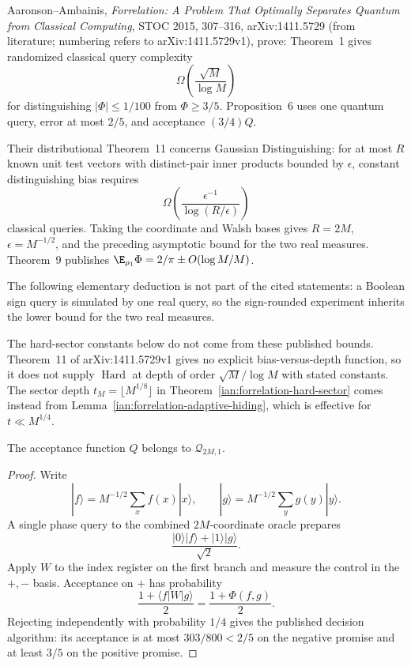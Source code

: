 \begin{remark}\label{ian:forrelation-published-bounds}
Aaronson--Ambainis, \emph{Forrelation: A Problem That Optimally Separates Quantum from Classical Computing}, STOC 2015, 307--316, arXiv:1411.5729 (from literature; numbering refers to arXiv:1411.5729v1), prove:
Theorem~1 gives randomized classical query complexity
\[
 \Omega\!\left(\frac{\sqrt M}{\log M}\right)
\]
for distinguishing \(|\Phi|\le1/100\) from \(\Phi\ge3/5\).
Proposition~6 uses one quantum query, error at most \(2/5\), and acceptance \((3/4)Q\).

Their distributional Theorem~11 concerns Gaussian Distinguishing: for at most \(R\) known unit test vectors with distinct-pair inner products bounded by \(\epsilon\), constant distinguishing bias requires
\[
 \Omega\!\left(\frac{\epsilon^{-1}}{\log(R/\epsilon)}\right)
\]
classical queries. Taking the coordinate and Walsh bases gives \(R=2M\), \(\epsilon=M^{-1/2}\), and the preceding asymptotic bound for the two real measures. Theorem~9 publishes \(\E_{\rho_1}\Phi=2/\pi\pm O(\log M/M)\).
\end{remark}

The following elementary deduction is not part of the cited statements: a Boolean sign query is simulated by one real query, so the sign-rounded experiment inherits the lower bound for the two real measures.

The hard-sector constants below do not come from these published bounds. Theorem~11 of arXiv:1411.5729v1 gives no explicit bias-versus-depth function, so it does not supply \(\operatorname{Hard}\) at depth of order \(\sqrt M/\log M\) with stated constants. The sector depth \(t_M=\lfloor M^{1/8}\rfloor\) in Theorem~\ref{ian:forrelation-hard-sector} comes instead from Lemma~\ref{ian:forrelation-adaptive-hiding}, which is effective for \(t\ll M^{1/4}\).

\begin{proposition}\label{ian:forrelation-one-query}
The acceptance function \(Q\) belongs to \(\mathcal Q_{2M,1}\).
\end{proposition}
\begin{proof}
Write
\[
 |f\rangle=M^{-1/2}\sum_xf(x)|x\rangle,\qquad
 |g\rangle=M^{-1/2}\sum_yg(y)|y\rangle.
\]
A single phase query to the combined \(2M\)-coordinate oracle prepares
\[
 \frac{|0\rangle|f\rangle+|1\rangle|g\rangle}{\sqrt2}.
\]
Apply \(W\) to the index register on the first branch and measure the control in the \(+,-\) basis. Acceptance on \(+\) has probability
\[
 \frac{1+\langle f|W|g\rangle}{2}
 =\frac{1+\Phi(f,g)}2.
\]
Rejecting independently with probability \(1/4\) gives the published decision algorithm: its acceptance is at most \(303/800<2/5\) on the negative promise and at least \(3/5\) on the positive promise.
\end{proof}

